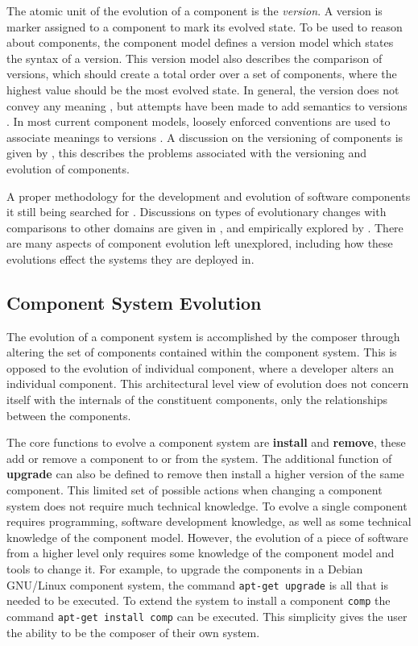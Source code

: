 The atomic unit of the evolution of a component is the \textit{version}.
A version is marker assigned to a component to mark its evolved state.
To be used to reason about components, the component model defines a version model which states the syntax of a version.
This version model also describes the comparison of versions, which should create a total order over a set of components, where the highest value should be the most evolved state.
In general, the version does not convey any meaning \citep{Stuckenholz2005}, but attempts have been made to add semantics to versions \cite{Bauml2009}.
In most current component models, loosely enforced conventions are used to associate meanings to versions \cite{Barth2005,osgicore2007}.
A discussion on the versioning of components is given by \cite{Stuckenholz2005},
this describes the problems associated with the versioning and evolution of components.

A proper methodology for the development and evolution of software components it still being searched for \citep{Szyperski2002}.
Discussions on types of evolutionary changes with comparisons to other domains are given in \citep{Papazoglou2011},
and empirically explored by \cite{vasa2007patterns}.
There are many aspects of component evolution left unexplored, including how these evolutions effect the systems they are deployed in.

\subsection{Component System Evolution}
The evolution of a component system is accomplished by the composer through altering the set of components contained within the component system.
This is opposed to the evolution of individual component, where a developer alters an individual component.
This architectural level view of evolution does not concern itself with the internals of the constituent components, only the relationships between the components.

The core functions to evolve a component system are \textbf{install} and \textbf{remove}, these add or remove a component to or from the system.
The additional function of \textbf{upgrade} can also be defined to remove then install a higher version of the same component. 
This limited set of possible actions when changing a component system does not require much technical knowledge. 
To evolve a single component requires programming, software development knowledge, as well as some technical knowledge of the component model.
However, the evolution of a piece of software from a higher level only requires some knowledge of the component model and tools to change it.
For example, to upgrade the components in a Debian GNU/Linux component system, the command \verb+apt-get upgrade+ is all that is needed to be executed.
To extend the system to install a component \verb+comp+ the command \verb+apt-get install comp+ can be executed.
This simplicity gives the user the ability to be the composer of their own system.

